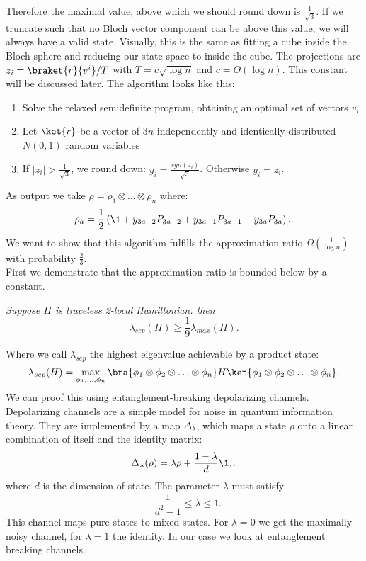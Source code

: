 Therefore the maximal value, above which we should round down is $\frac{1}{\sqrt{3}}$.
If we truncate such that no Bloch vector component can be above this value, we will always have a valid state.
Visually, this is the same as fitting a cube inside the Bloch sphere and reducing our state space to inside the cube.
The projections are $z_i=\braket{r}{v^i}/T$ with $T=c\sqrt{\log{}n}$ and $c=O(\log{}n)$.
This constant will be discussed later.
The algorithm looks like this:
\begin{enumerate}
	\item Solve the relaxed semidefinite program, obtaining an optimal set of vectors $v_i$
	\item Let $\ket{r}$ be a vector of $3n$ independently and identically distributed $N(0,1)$ random variables
	\item If $|z_i|>\frac{1}{\sqrt{3}}$, we round down: $y_i=\frac{sgn(z_i)}{\sqrt{3}}$. Otherwise $y_i=z_i$.
\end{enumerate}
As output we take $ \rho=\rho_1\otimes\ldots\otimes\rho_n$ where:\[
	\rho_a=\frac{1}{2}\left(\1 +y_{3a-2}P_{3a-2}+y_{3a-1}P_{3a-1}+y_{3a}P_{3a}\right).
.\]
We want to show that this algorithm fulfills the approximation ratio $\Omega(\frac{1}{\log{}n})$ with probability $\frac{2}{3}$.\\
First we demonstrate that the approximation ratio is bounded below by a constant.\cite{lieb73}
\begin{thm}\emph{
	Suppose $H$ is traceless 2-local Hamiltonian. then \[
	\lambda_{sep}(H)\ge \frac{1}{9}\lambda_{max}(H)
.\]}
\end{thm}
Where we call $\lambda_{sep}$ the highest eigenvalue achievable by a product state: \[
	\lambda_{sep}(H)=\max_{\phi_1,\ldots,\phi_n}\bra{\phi_1\otimes\phi_2\otimes\ldots\otimes\phi_n}H\ket{\phi_1\otimes\phi_2\otimes\ldots\otimes\phi_n}
.\]
We can proof this using entanglement-breaking depolarizing channels.
Depolarizing channels are a simple model for noise in quantum information theory. \cite{nielsen11}
They are implemented by a map $\Delta_{\lambda}$, which maps a state  $\rho$ onto a linear combination of itself and the identity matrix:\cite{king02}\[
	\Delta_{\lambda}(\rho)=\lambda\rho+\frac{1-\lambda}{d}\1,
.\]
where $d$ is the dimension of state. The parameter $\lambda$ must satisfy \[
	-\frac{1}{d^2-1}\le\lambda\le 1
.\]
This channel maps pure states to mixed states.
For $\lambda=0$ we get the maximally noisy channel, for $\lambda=1$ the identity.
In our case we look at entanglement breaking channels.

